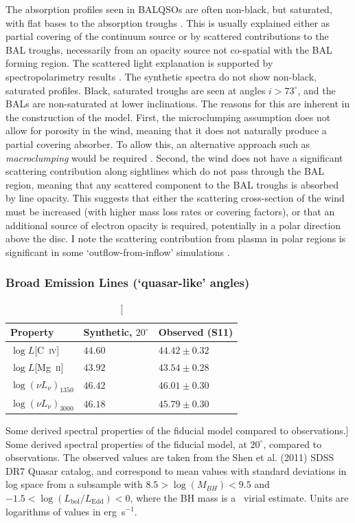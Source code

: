 The absorption profiles seen in BALQSOs are often non-black, but saturated, 
with flat bases to the absorption troughs \citep{arav1999b,arav1999a}.
This is usually explained either as  partial covering of the continuum
source or by scattered contributions to the BAL troughs, necessarily
from an opacity source not co-spatial with the BAL forming region.
The scattered light explanation is supported by spectropolarimetry results
\citep{lamy2000}. The synthetic spectra do not show non-black, saturated profiles.
Black, saturated troughs are seen at angles $i > 73^\circ$, and the BALs
are non-saturated at lower inclinations. The reasons for this are inherent 
in the construction of the model. 
First, the microclumping assumption does not allow for 
porosity in the wind, meaning that it does not naturally produce
a partial covering absorber. To allow this, an alternative approach
such as {\em macroclumping} would be required \citep[e.g.][]{hamann2008,surlan2012}.
Second, the wind does not have a significant scattering contribution 
along sightlines which do not pass through the BAL region,
meaning that any scattered component to the BAL troughs is absorbed by line opacity.
This suggests that either the scattering cross-section of the wind must
be increased (with higher mass loss rates or covering factors), or 
that an additional source of electron opacity is required, potentially
in a polar direction above the disc. I note the scattering contribution
from plasma in polar regions is significant in some `outflow-from-inflow'
simulations \citep{KP09, simproga2012}.

\subsubsection{Broad Emission Lines (`quasar-like' angles)}

\begin{table}
\centering
\begin{tabular}{p{2cm}p{2cm}p{3cm}}
\hline Property & Synthetic, $20^\circ$ & Observed  (S11) \\ 
\hline \hline
$\log L$[C~\textsc{iv}]  & $44.60$ & $44.42 \pm 0.32$  \\
$\log L$[Mg~\textsc{ii}] & $43.92$ & $43.54 \pm 0.28$  \\
$\log (\nu L_{\nu})_{1350}$  & $46.42$ & $46.01 \pm 0.30$ \\
$\log (\nu L_{\nu})_{3000}$  & $46.18$ & $45.79 \pm 0.30$ \\
\hline
\end{tabular}
\caption
[Some derived spectral properties of the fiducial model compared to observations.]
{
Some derived spectral properties of the fiducial model, at $20^\circ$,
compared to observations. The observed values are taken from the Shen et al. (2011)
SDSS DR7 Quasar catalog, and correspond to mean values with standard deviations in log space
from a subsample with $8.5>\log(M_{BH})<9.5$ and 
$-1.5<\log (L_{\mathrm{bol}}/L_{\mathrm{Edd}}) < 0$,
where the BH mass is a \civ\ virial estimate. 
Units are logarithms of values in erg~s$^{-1}$.
}
\label{line_lums}
\end{table}


